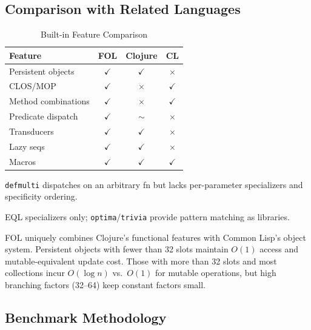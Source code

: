 \documentclass[sigconf,nonacm,review]{acmart}
\begin{document}
\subsection{Comparison with Related Languages}

\begin{table}[htbp]
\centering
\caption{Built-in Feature Comparison}
\small
\begin{threeparttable}
    \begin{tabular}{lccc}
    \toprule
    \textbf{Feature} & \textbf{FOL} & \textbf{Clojure} & \textbf{CL} \\
    \midrule
    Persistent objects & $\checkmark$ & $\checkmark$ & $\times$ \\
    CLOS/MOP & $\checkmark$ & $\times$ & $\checkmark$ \\
    Method combinations & $\checkmark$ & $\times$ & $\checkmark$ \\
    Predicate dispatch & $\checkmark$ & $\sim$\tnote{a} & $\times$\tnote{b} \\
    Transducers & $\checkmark$ & $\checkmark$ & $\times$ \\
    Lazy seqs & $\checkmark$ & $\checkmark$ & $\times$ \\
    Macros & $\checkmark$ & $\checkmark$ & $\checkmark$ \\
    \bottomrule
    \end{tabular}
    \begin{tablenotes}
        \footnotesize
        \item[a] \texttt{defmulti} dispatches on an arbitrary fn but lacks per-parameter specializers and specificity ordering.
        \item[b] EQL specializers only; \texttt{optima}/\texttt{trivia} provide pattern matching as libraries.
    \end{tablenotes}
\end{threeparttable}
\end{table}

FOL uniquely combines Clojure's functional features with Common Lisp's object system. Persistent objects with fewer than 32 slots maintain $O(1)$ access and mutable-equivalent update cost. Those with more than 32 slots and most collections incur $O(\log n)$ vs.\ $O(1)$ for mutable operations, but high branching factors (32--64) keep constant factors small.

\subsection{Benchmark Methodology}
\end{document}
